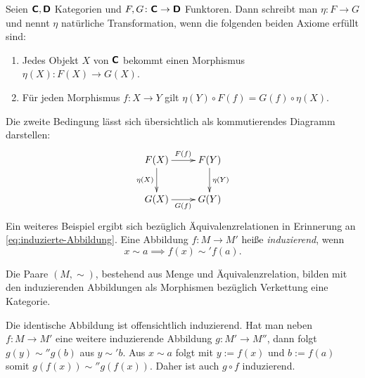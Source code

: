 \begin{Definition}\newlinefirst
Seien $\textsf{\textbf{C}}, \textsf{\textbf{D}}$ Kategorien und
$F,G\colon \textsf{\textbf{C}}\to \textsf{\textbf{D}}$ Funktoren.
Dann schreibt man $\eta\colon F\to G$ und nennt $\eta$ natürliche
Transformation, wenn die folgenden beiden Axiome erfüllt sind:
\begin{enumerate}
\item Jedes Objekt $X$ von $\textsf{\textbf{C}}$ bekommt einen Morphismus\\
$\eta(X)\colon F(X)\to G(X)$.
\item Für jeden Morphismus $f\colon X\to Y$ gilt
$\eta(Y)\circ F(f)=G(f)\circ\eta(X)$.
\end{enumerate}
\end{Definition}
Die zweite Bedingung lässt sich übersichtlich als kommutierendes Diagramm
darstellen:
\[\xymatrix{
F(X) \ar[r]^{F(f)} \ar[d]_{\eta(X)} & F(Y) \ar[d]^{\eta(Y)} \\
G(X) \ar[r]_{G(f)} & G(Y)}\]
Ein weiteres Beispiel ergibt sich bezüglich Äquivalenzrelationen
in Erinnerung an \eqref{eq:induzierte-Abbildung}.
Eine Abbildung $f\colon M\to M'$ heiße \emph{induzierend}, wenn%
\[x\sim a \implies f(x)\sim' f(a).\]

\begin{Satz}
Die Paare $(M,\sim)$, bestehend aus Menge und Äquivalenzrelation,
bilden mit den induzierenden Abbildungen
als Morphismen bezüglich Verkettung eine Kategorie.
\end{Satz}
Die identische Abbildung ist offensichtlich induzierend. Hat man
neben $f\colon M\to M'$ eine weitere induzierende Abbildung $g\colon M'\to M''$, dann
folgt $g(y)\sim'' g(b)$ aus $y\sim' b$. Aus $x\sim a$ folgt
mit $y:=f(x)$ und $b:=f(a)$ somit $g(f(x))\sim'' g(f(x))$.
Daher ist auch $g\circ f$ induzierend.\;\qedsymbol

